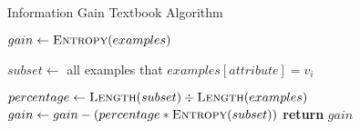 \begin{algorithm}[H]
\caption{Information Gain Textbook Algorithm}\label{a:id3-gain-simple}
\begin{algorithmic}[1]
    \State $gain \gets \textsc{Entropy}(examples)$

        \State $subset \gets$ {\small all examples that} $examples[attribute] = v_i$

        \State $percentage \gets \textsc{Length}(subset) \div \textsc{Length}(examples)$
            \State $gain \gets gain - (percentage * \textsc{Entropy}(subset))$
        \EndIf
    \EndFor
    \State \textbf{return} $gain$
\EndProcedure
\end{algorithmic}
\end{algorithm}
